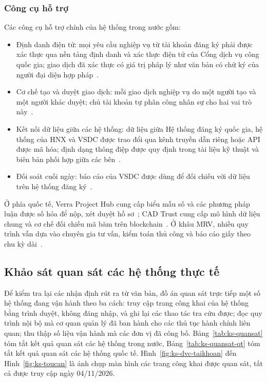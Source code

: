 \subsubsection*{Công cụ hỗ trợ}

Các công cụ hỗ trợ chính của hệ thống trong nước gồm:
\begin{itemize}
    \item Định danh điện tử: mọi yêu cầu nghiệp vụ từ tài khoản đăng ký phải được xác thực qua nền tảng định danh và xác thực điện tử của Cổng dịch vụ công quốc gia; giao dịch đã xác thực có giá trị pháp lý như văn bản có chữ ký của người đại diện hợp pháp~\cite{vietnam2026thongtu11}.
    \item Cơ chế tạo và duyệt giao dịch: mỗi giao dịch nghiệp vụ do một người tạo và một người khác duyệt; chủ tài khoản tự phân công nhân sự cho hai vai trò này~\cite{vietnam2026thongtu11}.
    \item Kết nối dữ liệu giữa các hệ thống: dữ liệu giữa Hệ thống đăng ký quốc gia, hệ thống của HNX và VSDC được trao đổi qua kênh truyền dẫn riêng hoặc API được mã hóa; định dạng thông điệp được quy định trong tài liệu kỹ thuật và biên bản phối hợp giữa các bên~\cite{vietnam2026thongtu11}.
    \item Đối soát cuối ngày: báo cáo của VSDC được dùng để đối chiếu với dữ liệu trên hệ thống đăng ký~\cite{vietnam2026thongtu11}.
\end{itemize}
Ở phía quốc tế, Verra Project Hub cung cấp biểu mẫu số và các phương pháp luận được số hóa để nộp, xét duyệt hồ sơ~\cite{verra2024projecthub}; CAD Trust cung cấp mô hình dữ liệu chung và cơ chế đối chiếu mã băm trên blockchain~\cite{cadtrust2025datamodel}. Ở khâu MRV, nhiều quy trình vẫn dựa vào chuyên gia tư vấn, kiểm toán thủ công và báo cáo giấy theo chu kỳ dài~\cite{tsai2024blockchain}.

\FloatBarrier
\subsection*{Khảo sát quan sát các hệ thống thực tế}
\label{subsec:ks-quansat}

Để kiểm tra lại các nhận định rút ra từ văn bản, đồ án quan sát trực tiếp một số hệ thống đang vận hành theo ba cách: truy cập trang công khai của hệ thống bằng trình duyệt, không đăng nhập, và ghi lại các thao tác tra cứu được; đọc quy trình nội bộ mà cơ quan quản lý đã ban hành cho các thủ tục hành chính liên quan; thu thập số liệu vận hành mà các đơn vị đã công bố. Bảng~\ref{tab:ks-quansat} tóm tắt kết quả quan sát các hệ thống trong nước, Bảng~\ref{tab:ks-quansat-qt} tóm tắt kết quả quan sát các hệ thống quốc tế. Hình~\ref{fig:ks-dvc-taikhoan} đến Hình~\ref{fig:ks-toucan} là ảnh chụp màn hình các trang công khai được quan sát, tất cả được truy cập ngày 04/11/2026.

